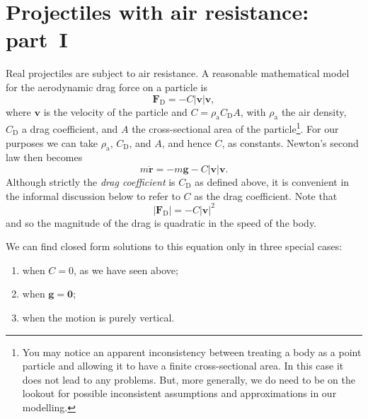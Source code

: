\section{Projectiles with air resistance: part~I}
\label{sec:air_res_I}

Real projectiles are subject to air resistance. A reasonable mathematical model
for the aerodynamic drag force on a particle is
\begin{equation}
\boldsymbol{F}_\mathrm{D} = - C |\boldsymbol{v}| \boldsymbol{v} ,
\end{equation}
where $\boldsymbol{v}$ is the velocity of the particle and $C = \rho_\mathrm{a} C_\mathrm{D} A$,
with $\rho_\mathrm{a}$ the air density, $C_\mathrm{D}$ a drag coefficient, and $A$ the
cross-sectional area of the particle\footnote{You may notice an apparent inconsistency
between treating a body as a point particle and allowing it to have a finite cross-sectional
area. In this case it does not lead to any problems. But, more generally, we do need to be
on the lookout for possible inconsistent assumptions and approximations in our modelling.
}.
For our purposes we can take $\rho_\mathrm{a}$, $C_\mathrm{D}$, and $A$, and hence $C$, as
constants. Newton's second law then becomes
\begin{equation}
\label{eq:proj_air_res}
m \ddot{\boldsymbol{r}} = - m \boldsymbol{g} - C |\boldsymbol{v}| \boldsymbol{v} .
\end{equation}
Although strictly the \emph{drag coefficient} is $C_{\mathrm{D}}$ as defined above, it is 
convenient in the informal discussion below to refer to $C$ as the drag coefficient.  Note that
\begin{equation}
|\boldsymbol{F}_\mathrm{D} |= - C |\boldsymbol{v}|^2
\end{equation}
and so the magnitude of the drag is quadratic in the speed of the body.


We can find closed form solutions to this equation only in three special cases:
\begin{enumerate}
\item
when $C = 0$, as we have seen above;
\item
when $\boldsymbol{g} = \boldsymbol{0}$;
\item
when the motion is purely vertical.
\end{enumerate}


